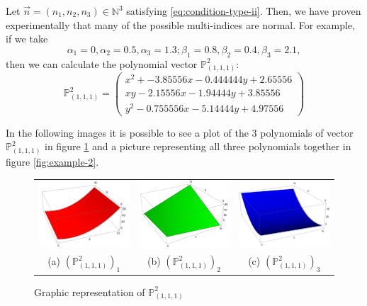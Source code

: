 \documentclass[12pt,a4]{report}
\theoremstyle{plain}
\newcommand{\N}[0]{\mathbb{N}}
\begin{document}
Let $\vec n=(n_1,n_2,n_3)\in\N^3$ satisfying \eqref{eq:condition-type-ii}. Then, we have proven experimentally that many of the possible multi-indices are normal. For example, if we take $$\alpha_1 = 0, \alpha_2 = 0.5, \alpha_3 = 1.3; \beta_1 = 0.8, \beta_2 = 0.4, \beta_3 = 2.1,$$ then we can calculate the polynomial vector $\mathbb P_{(1,1,1)}^2$:
$$
\mathbb P_{(1,1,1)}^2 = \begin{pmatrix}
    x^2 + - 3.85556 x - 0.444444 y + 2.65556 \\ x y - 2.15556 x - 1.94444 y + 3.85556 \\  y^2 - 0.755556 x - 5.14444 y + 4.97556
\end{pmatrix}
$$

In the following images it is possible to see a plot of the 3 polynomials of vector $\mathbb P_{(1,1,1)}^2$ in figure \ref{fig:example} and a picture representing all three polynomials together in figure \ref{fig:example-2}.
\begin{figure}[h]
    \centering\begin{tabular}{ccc}
      \includegraphics[width=4.5cm]{./img/laguerre1.png} & 
      \includegraphics[width=4.5cm]{./img/laguerre2.png} &
      \includegraphics[width=4.5cm]{./img/laguerre3.png} \\
      (a) $(\mathbb P_{(1,1,1)}^2)_1$ & (b) $(\mathbb P_{(1,1,1)}^2)_2$ & (c) $(\mathbb P_{(1,1,1)}^2)_3$  \\
    \end{tabular}
    \caption{Graphic representation of $\mathbb P_{(1,1,1)}^2$}
    \label{fig:example}
  \end{figure}
\end{document}

